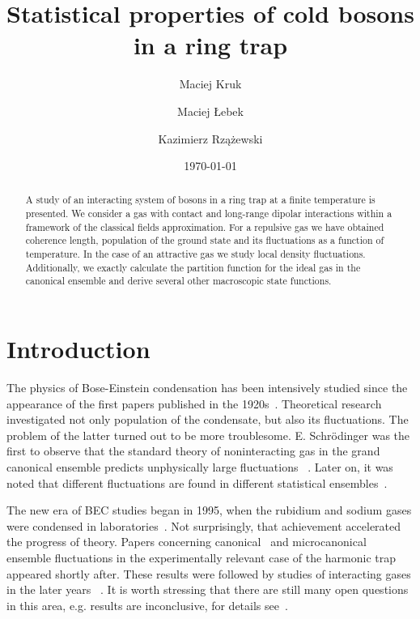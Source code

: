 \documentclass[aps,pra,reprint]{revtex4-2}
\begin{document}
\title{Statistical properties of cold bosons in a ring trap}
\date{\today}

\author{Maciej Kruk}

\author{Maciej Łebek}

\author{Kazimierz Rzążewski}

\begin{abstract}
A study of an interacting system of bosons in a ring trap at a finite 
temperature is presented. We consider a gas with contact and long-range dipolar 
interactions within a framework of the classical fields approximation. For a 
repulsive gas we have obtained coherence length, population of the ground state 
and its fluctuations as a function of temperature. In the case of an attractive 
gas we study local density fluctuations.  Additionally, we exactly calculate 
the partition function for the ideal gas in the canonical ensemble and derive 
several other macroscopic state functions.
\end{abstract}

\maketitle

\section{Introduction}\label{intro}
The physics of Bose-Einstein condensation has been intensively studied since 
the appearance of the first papers published in the 1920s~\cite{Bose1924,
*Einstein1924,*Einstein1925}. Theoretical research investigated not only 
population of the condensate, but also its fluctuations. The problem of the 
latter turned out to be more troublesome. E. Schr{\"o}dinger was the first 
to observe that the standard theory of noninteracting gas in the grand 
canonical ensemble predicts unphysically large fluctuations 
~\cite{Schrodinger1989}. Later on, it was noted that different 
fluctuations are found in different statistical ensembles~\cite{Ziff1977}.
    
The new era of BEC studies began in 1995, when the rubidium and sodium gases 
were condensed in laboratories~\cite{Davis1995,*Anderson1995}. Not 
surprisingly, that achievement accelerated the progress of theory. Papers 
concerning canonical~\cite{Politzer1996} and microcanonical~\cite{Navez1997} 
ensemble fluctuations in the experimentally relevant case of the harmonic trap 
appeared shortly after. These results were followed by studies of interacting 
gases in the later years
~\cite{Bienias2011c,Bienias2011b,Bhattacharyya2016,Idziaszek1999}. It is worth 
stressing that there are still many open questions in this area, e.g. results 
are inconclusive, for details see~\cite{Kristensen2019}.
    
\end{document}
